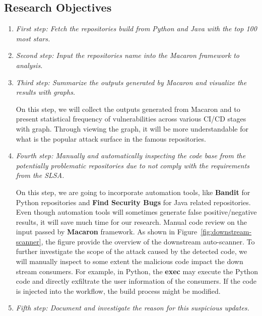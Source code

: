 \subsection{Research Objectives}
\begin{enumerate}
    \item \emph{First step: Fetch the repositories build from Python and Java with the top 100 most stars.}
    \item \emph{Second step: Input the repositories name into the Macaron framework to analysis.}
    \item \emph{Third step: Summarize the outputs generated by Macaron and visualize the results with graphs.}
    
    On this step, we will collect the outputs generated from Macaron and to present statistical frequency of vulnerabilities across various CI/CD stages with graph.
    Through viewing the graph, it will be more understandable for what is the popular attack surface in the famous repositories. 
    \item \emph{Fourth step: Manually and automatically inspecting the code base from the potentially problematic repositories 
    due to not comply with the requirements from the SLSA.}
    
    On this step, we are going to incorporate automation tools, like \textbf{Bandit} for Python repositories and \textbf{Find Security Bugs} for Java related repositories.
    Even though automation tools will sometimes generate false positive/negative results, it will save much time for our research.
    Manual code review on the input passed by \textbf{Macaron} framework. As shown in Figure~\ref{fig:downstream-scanner}, the figure provide the overview of the  downstream auto-scanner.
    To further investigate the scope of the attack caused by
    the detected code, we will manually inspect to some extent the malicious code impact the down stream consumers.
    For example, in Python, the \textbf{exec} may execute the Python code and directly exfiltrate the user information of the consumers.
    If the code is injected into the workflow, the build process might be modified.


    \item \emph{Fifth step: Document and investigate the reason for this suspicious updates.}
    

\end{enumerate}
